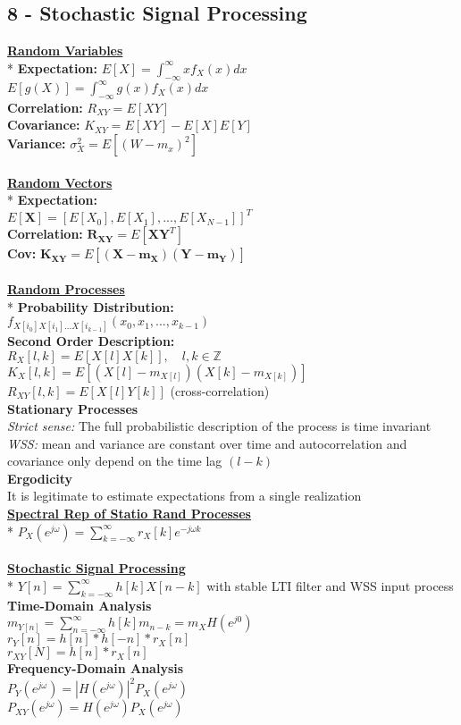 \documentclass{article}
\newcommand{\para}[1]{\textbf{\underline{#1}}\\*} %
\newcommand{\subpara}[1]{\textbf{#1}}
\begin{document}
\subsection{8 - Stochastic Signal Processing} 
\begin{multicols}{3}
\para{Random Variables}
\subpara{Expectation:} $E[X] = \int_{-\infty}^\infty x f_X(x)dx$\\
$E[g(X)] = \int_{-\infty}^\infty g(x) f_X(x)dx$\\
\subpara{Correlation:} $R_{XY} = E[XY]$\\
\subpara{Covariance:} $K_{XY} = E[XY]-E[X]E[Y]$\\
\subpara{Variance:} $\sigma_X^2 = E[(W-m_x)^2]$\\
\\ \para{Random Vectors}
\subpara{Expectation:}\\ $E[\mathbf{X}] = \left [ E[X_0],E[X_1], ..., E[X_{N-1}] \right]^T  $\\
\subpara{Correlation:} $\mathbf{R_{XY}} = E[\mathbf{XY}^T]$\\
\subpara{Cov:} $\mathbf{K_{XY}} = E[(\mathbf{X-m_X})(\mathbf{Y-m_Y})]$\\
\\\para{Random Processes}
\subpara{Probability Distribution:}\\$f_{X[i_0]X[i_1]...X[i_{k-1}]}(x_0, x_1,...,x_{k-1})$\\
\subpara{Second Order Description:}\\
$R_X[l,k] = E[X[l]X[k]], \quad l,k \in \mathbb{Z}$\\
$K_X[l,k] = E\left [\left(X[l]-m_{X[l]}\right)\left(X[k]-m_{X[k]}\right)\right]$\\
$R_{XY}[l,k] = E[X[l]Y[k]]$ (cross-correlation)\\
\subpara{Stationary Processes}\\
\textit{Strict sense:} The full probabilistic description of the process is time invariant\\
\textit{WSS:} mean and variance are constant over time and autocorrelation and covariance only depend on the time lag $(l-k)$\\
\subpara{Ergodicity}\\
It is legitimate to estimate expectations from a single realization 
\\\para{Spectral Rep of Statio Rand Processes}
$P_X(e^{j\omega}) =\sum_{k=-\infty}^\infty r_X[k] e^{-j\omega k}$\\
\\\para{Stochastic Signal Processing}
$\displaystyle Y[n] = \sum_{k=-\infty}^\infty h[k]X[n-k]$  with stable LTI filter and WSS input process\\
\subpara{Time-Domain Analysis}\\
$ m_{Y[n]}= \sum_{n=-\infty}^\infty h[k]m_{n-k} = m_XH(e^{j0})$\\
$r_Y[n]= h[n]*h[-n]*r_X[n]$\\
$ r_{XY}[N] = h[n]*r_X[n]$\\
\subpara{Frequency-Domain Analysis}\\
$P_Y(e^{j\omega}) = \left | H(e^{j\omega}) \right | ^2 P_X(e^{j\omega})$\\
$P_{XY}(e^{j\omega}) = H(e^{j\omega}) P_X(e^{j\omega})$


\end{multicols}
\end{document}
